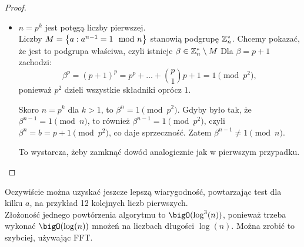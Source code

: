 \begin{proof}
\begin{itemize}
        \item \( n = p^k \) jest potęgą liczby pierwszej. \\
        Liczby \( M = \set{a : a^{n-1} = 1 \mod n} \) stanowią podgrupę \( \mathbb{Z}_n^* \). Chcemy pokazać, że jest to podgrupa właściwa, czyli istnieje \( \beta \in \mathbb{Z}_n^* \setminus M \)
        Dla \( \beta = p + 1 \) zachodzi:
        \[
            \beta^p = (p + 1)^p = p^p + \ldots + \binom{p}{1} p + 1 = 1 \pmod{p^2},
        \]
        ponieważ \( p^2 \) dzieli wszystkie składniki oprócz \( 1 \).
        
        Skoro \( n = p^k \) dla \( k > 1 \), to \( \beta^n = 1 \pmod{p^2} \).
        Gdyby było tak, że \( \beta^{n-1} = 1 \pmod{n} \), to również \( \beta^{n-1} = 1 \pmod{p^2} \), czyli \( \beta^n = b = p + 1 \pmod{p^2} \), co daje sprzeczność. Zatem \( \beta^{n-1} \neq 1 \pmod{n} \).
        
        To wystarcza, żeby zamknąć dowód analogicznie jak w pierwszym przypadku.
    \end{itemize}
\end{proof}
Oczywiście można uzyskać jeszcze lepszą wiarygodność, powtarzając test dla kilku \( a \), na przykład 12 kolejnych liczb pierwszych. \\
Złożoność jednego powtórzenia algorytmu to \( \bigO(\log^3(n)) \), ponieważ trzeba wykonać \( \bigO(\log(n)) \) mnożeń na liczbach długości \( \log(n) \). Można zrobić to szybciej, używając FFT.
